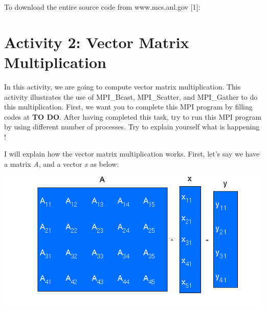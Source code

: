 \documentclass[letterpaper,10pt,openany,oneside]{sphinxmanual}
\begin{document}
To download the entire source code from www.mcs.anl.gov {[}1{]}:


\section{Activity 2: Vector Matrix Multiplication}
\label{CompileAndActivity/compileandactivity:activity-2-vector-matrix-multiplication}
In this activity, we are going to compute vector matrix multiplication. This activity illustrates the use of MPI\_Bcast, MPI\_Scatter, and MPI\_Gather to do this multiplication. First, we want you to complete this MPI program by filling codes at \textbf{TO DO}. After having completed this task, try to run this MPI program by using different number of processes. Try to explain yourself what is happening !

I will explain how the vector matrix multiplication works. First, let's say we have a matrix \emph{A}, and a vector \emph{x} as below:

{\hfill\includegraphics{vector_matrix_multi.png}\hfill}
\end{document}
